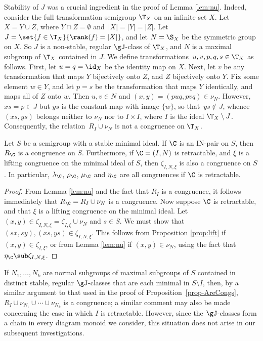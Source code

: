 \begin{rem}\label{rem:TX}
Stability of $J$ was a crucial ingredient in the proof of Lemma \ref{lem:nu}.  Indeed, consider the full transformation semigroup $\T_X$ on an infinite set $X$.  Let $X=Y\cup Z$, where $Y\cap Z=\emptyset$ and~${|X|=|Y|=|Z|}$.  Let~$J=\set{f\in\T_X}{\rank(f)=|X|}$, and let $N=\S_X$ be the symmetric group on $X$.  So $J$ is a non-stable, regular $\gJ$-class of $\T_X$, and $N$ is a maximal subgroup of $\T_X$ contained in $J$.  We define transformations~$u,v,p,q,s\in\T_X$ as follows.  First, let $u=q=\id_X$ be the identity map on $X$.  Next, let $v$ be any transformation that maps $Y$ bijectively onto $Z$, and $Z$ bijectively onto $Y$.  Fix some element $w\in Y$, and let $p=s$ be the transformation that maps $Y$ identically, and maps all of $Z$ onto $w$.  Then $u,v\in N$ and $(x,y)=(puq,pvq)\in\nu_N$.  However, $xs=p\in J$ but $ys$ is the constant map with image $\{w\}$, so that~$ys\not\in J$, whence $(xs,ys)$ belongs neither to $\nu_N$ nor to $I\times I$, where $I$ is the ideal $\T_X\setminus J$.  Consequently, the relation~$R_I\cup\nu_N$ is not a congruence on $\T_X$.
\end{rem}

\begin{proposition}
\label{prop-AreCongs}
Let $S$ be a semigroup with a stable minimal ideal.  If $\C$ is an IN-pair on $S$, then $R_\C$ is a congruence on $S$.  Furthermore, if $\C=(I,N)$ is retractable, and $\xi$ is a lifting congruence on the minimal ideal of $S$, then $\zeta_{I,N,\xi}$ is also a congruence on $S$.  In particular, $\lambda_\C$, $\rho_\C$, $\mu_\C$ and $\eta_\C$ are all congruences if $\C$ is retractable.
\end{proposition}

\begin{proof}
From Lemma \ref{lem:nu} and the fact that $R_I$ is a congruence, it follows immediately that $R_\C=R_I\cup\nu_N$ is a congruence.  Now suppose $\C$ is retractable, and that $\xi$ is a lifting congruence on the minimal ideal.  Let $(x,y)\in\zeta_{I,N,\xi}=\zeta_{I,\xi}\cup\nu_N$ and $s\in S$.  We must show that $(sx,sy),(xs,ys)\in\zeta_{I,N,\xi}$.  This follows from Proposition \ref{prop:lift} if $(x,y)\in\zeta_{I,\xi}$, or from Lemma \ref{lem:nu} if $(x,y)\in\nu_N$, using the fact that~$\eta_\C\sub\zeta_{I,N,\xi}$.  \end{proof}



\begin{rem}
If $N_1,\ldots,N_k$ are normal subgroups of maximal subgroups of $S$ contained in distinct stable, regular $\gJ$-classes that are each minimal in $S\setminus I$, then, by a similar argument to that used in the proof of Proposition~\ref{prop-AreCongs}, $R_I\cup\nu_{N_1}\cup\cdots\cup\nu_{N_k}$ is a congruence; a similar comment may also be made concerning the case in which $I$ is retractable.  However, since the $\gJ$-classes form a chain in every diagram monoid we consider, this situation does not arise in our subsequent investigations.
\end{rem}

